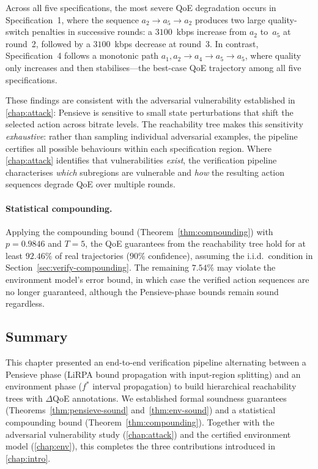 \documentclass[thesis]{uofithesis} %
\begin{document}
    Across all five specifications, the most severe QoE degradation
    occurs in Specification~1, where the sequence
    $a_2 \to a_5 \to a_2$ produces two large quality-switch penalties
    in successive rounds: a $3100$~kbps increase from $a_2$ to~$a_5$
    at round~2, followed by a $3100$~kbps decrease at round~3.
    In contrast, Specification~4 follows a monotonic path
    $a_1, a_2 \to a_4 \to a_5 \to a_5$, where quality only increases
    and then stabilises---the best-case QoE trajectory among all five
    specifications.

    These findings are consistent with the adversarial vulnerability
    established in \ref{chap:attack}: Pensieve is sensitive to
    small state perturbations that shift the selected action across
    bitrate levels.  The reachability tree makes this sensitivity
    \emph{exhaustive}: rather than sampling individual adversarial
    examples, the pipeline certifies all possible behaviours within
    each specification region.  Where \ref{chap:attack} identifies
    that vulnerabilities \emph{exist}, the verification pipeline
    characterises \emph{which} subregions are vulnerable and
    \emph{how} the resulting action sequences degrade QoE over
    multiple rounds.

    \paragraph{Statistical compounding.}
    Applying the compounding bound (Theorem~\ref{thm:compounding}) with
    $p = 0.9846$ and $T = 5$, the QoE guarantees from the reachability
    tree hold for at least $92.46\%$ of real trajectories ($90\%$
    confidence), assuming the i.i.d.\ condition in
    Section~\ref{sec:verify-compounding}.  The remaining $7.54\%$ may
    violate the environment model's error bound, in which case the
    verified action sequences are no longer guaranteed, although the
    Pensieve-phase bounds remain sound regardless.


    \subsection{Summary}
    \label{sec:verify-summary}

    This chapter presented an end-to-end verification pipeline alternating
    between a Pensieve phase (LiRPA bound propagation with input-region
    splitting) and an environment phase ($f^{\ast}$ interval propagation)
    to build hierarchical reachability trees with $\Delta$QoE annotations.
    We established formal soundness guarantees
    (Theorems~\ref{thm:pensieve-sound} and~\ref{thm:env-sound}) and a
    statistical compounding bound (Theorem~\ref{thm:compounding}).
    Together with the adversarial vulnerability study (\ref{chap:attack})
    and the certified environment model (\ref{chap:env}), this completes
    the three contributions introduced in \ref{chap:intro}.
\end{document}

